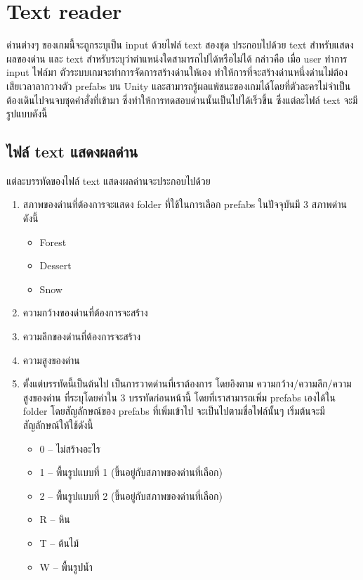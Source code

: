\section{Text reader}
ด่านต่างๆ ของเกมนี้จะถูกระบุเป็น input ด้วยไฟล์ text สองชุด ประกอบไปด้วย text สำหรับแสดงผลของด่าน และ text สำหรับระบุว่าตำแหน่งใดสามารถไปได้หรือไม่ได้ กล่าวคือ เมื่อ user ทำการ input ไฟล์มา ตัวระบบเกมจะทำการจัดการสร้างด่านให้เอง
ทำให้การที่จะสร้างด่านหนึ่งด่านไม่ต้องเสียเวลาลากวางตัว prefabs บน Unity และสามารถรู้ผลแพ้ชนะของเกมได้โดยที่ตัวละครไม่จำเป็นต้องเดินไปจนจบชุดคำสั่งที่เข้ามา ซึ่งทำให้การทดสอบด่านนั้นเป็นไปได้เร็วขึ้น
ซึ่งแต่ละไฟล์ text จะมีรูปแบบดังนี้

\subsection{ไฟล์ text แสดงผลด่าน}
แต่ละบรรทัดของไฟล์ text แสดงผลด่านจะประกอบไปด้วย
\begin{enumerate}
    \item สภาพของด่านที่ต้องการจะแสดง folder ที่ใช้ในการเลือก prefabs ในปัจจุบันมี 3 สภาพด่าน ดังนี้
    \begin{itemize}
        \item Forest
        \item Dessert
        \item Snow
    \end{itemize}
    \item ความกว้างของด่านที่ต้องการจะสร้าง
    \item ความลึกของด่านที่ต้องการจะสร้าง
    \item ความสูงของด่าน
    \item ตั้งแต่บรรทัดนี้เป็นต้นไป เป็นการวาดด่านที่เราต้องการ โดยอิงตาม ความกว้าง/ความลึก/ความสูงของด่าน ที่ระบุโดยค่าใน 3 บรรทัดก่อนหน้านี้ โดยที่เราสามารถเพิ่ม prefabs เองได้ใน folder  โดยสัญลักษณ์ของ prefabs ที่เพิ่มเข้าไป จะเป็นไปตามชื่อไฟล์นั้นๆ เริ่มต้นจะมีสัญลักษณ์ให้ใช้ดังนี้
    \begin{itemize}
        \item 0 -- ไม่สร้างอะไร
        \item 1 -- พื้นรูปแบบที่ 1 (ขึ้นอยู่กับสภาพของด่านที่เลือก)
        \item 2 -- พื้นรูปแบบที่ 2 (ขึ้นอยู่กับสภาพของด่านที่เลือก)
        \item R -- หิน
        \item T -- ต้นไม้
        \item W -- พื้นรูปน้ำ
    \end{itemize}
\end{enumerate}
